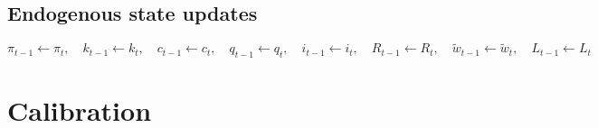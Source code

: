 \documentclass[11pt]{article}
\begin{document}
\subsection{Endogenous state updates}
\begin{equation*}
  \pi_{t-1} \leftarrow \pi_t, \quad
  k_{t-1} \leftarrow k_t, \quad
  c_{t-1} \leftarrow c_t, \quad
  q_{t-1} \leftarrow q_t, \quad
  i_{t-1} \leftarrow i_t, \quad
  R_{t-1} \leftarrow R_t, \quad
  \tilde{w}_{t-1} \leftarrow \tilde{w}_t, \quad
  L_{t-1} \leftarrow L_t
\end{equation*}


\section{Calibration}
\label{sec:calibration}
\end{document}
